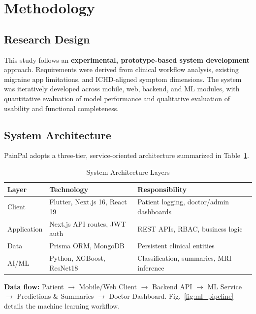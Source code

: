 \documentclass[conference,twocolumn,letterpaper]{IEEEtran}
\begin{document}
\section{Methodology}

\subsection{Research Design}
This study follows an \textbf{experimental, prototype-based system development} approach. Requirements were derived from clinical workflow analysis, existing migraine app limitations, and ICHD-aligned symptom dimensions. The system was iteratively developed across mobile, web, backend, and ML modules, with quantitative evaluation of model performance and qualitative evaluation of usability and functional completeness.

\subsection{System Architecture}
PainPal adopts a three-tier, service-oriented architecture summarized in Table~\ref{tab:architecture}.

\begin{table}[t]
\caption{System Architecture Layers}
\label{tab:architecture}
\centering
\begin{tabular}{@{}llp{}@{}}
\toprule
\textbf{Layer} & \textbf{Technology} & \textbf{Responsibility} \\
\midrule
Client & Flutter, Next.js 16, React 19 & Patient logging, doctor/admin dashboards \\
Application & Next.js API routes, JWT auth & REST APIs, RBAC, business logic \\
Data & Prisma ORM, MongoDB & Persistent clinical entities \\
AI/ML & Python, XGBoost, ResNet18 & Classification, summaries, MRI inference \\
\bottomrule
\end{tabular}
\end{table}

\textbf{Data flow:} Patient $\rightarrow$ Mobile/Web Client $\rightarrow$ Backend API $\rightarrow$ ML Service $\rightarrow$ Predictions \& Summaries $\rightarrow$ Doctor Dashboard. Fig.~\ref{fig:ml_pipeline} details the machine learning workflow.
\end{document}

